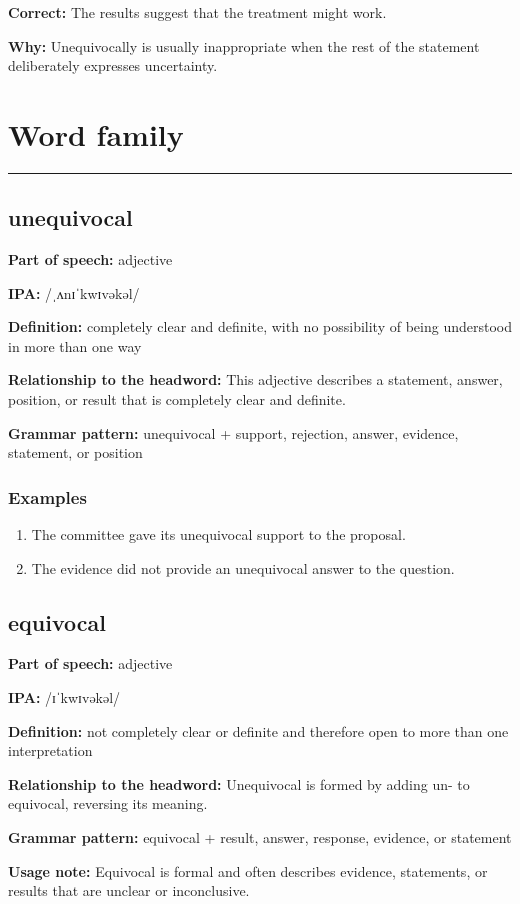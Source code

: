 \documentclass[11pt]{article}
\newcommand{\sectionrule}{\par\vspace{-0.5em}\noindent\textcolor{Accent}{\rule{\linewidth}{0.6pt}}\par}
\begin{document}
\textbf{Correct:} The results suggest that the treatment might work.

\textbf{Why:} Unequivocally is usually inappropriate when the rest of the statement deliberately expresses uncertainty.

\section{Word family}
\sectionrule
\subsection{unequivocal}
\textbf{Part of speech:} adjective

\textbf{IPA:} /ˌʌnɪˈkwɪvəkəl/

\textbf{Definition:} completely clear and definite, with no possibility of being understood in more than one way

\textbf{Relationship to the headword:} This adjective describes a statement, answer, position, or result that is completely clear and definite.

\textbf{Grammar pattern:} unequivocal + support, rejection, answer, evidence, statement, or position

\subsubsection{Examples}
\begin{enumerate}
  \item The committee gave its unequivocal support to the proposal.
  \item The evidence did not provide an unequivocal answer to the question.
\end{enumerate}

\subsection{equivocal}
\textbf{Part of speech:} adjective

\textbf{IPA:} /ɪˈkwɪvəkəl/

\textbf{Definition:} not completely clear or definite and therefore open to more than one interpretation

\textbf{Relationship to the headword:} Unequivocal is formed by adding un- to equivocal, reversing its meaning.

\textbf{Grammar pattern:} equivocal + result, answer, response, evidence, or statement

\textbf{Usage note:} Equivocal is formal and often describes evidence, statements, or results that are unclear or inconclusive.
\end{document}
